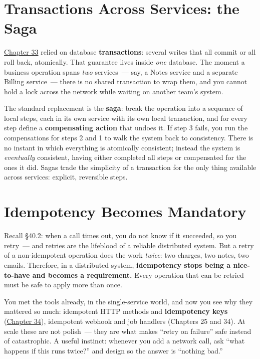 \setcounter{section}{4}
\section{Transactions Across Services: the Saga}\label{40-distributed-systems:405-transactions-across-services-the-saga}

\hyperref[ch:33-logic-execution]{Chapter 33} relied on database \textbf{transactions}: several writes that all commit or all roll back, atomically. That guarantee lives inside \emph{one} database. The moment a business operation spans \emph{two} services~--- say, a Notes service and a separate Billing service~--- there is no shared transaction to wrap them, and you cannot hold a lock across the network while waiting on another team's system.

The standard replacement is the \textbf{saga}: break the operation into a sequence of local steps, each in its own service with its own local transaction, and for every step define a \textbf{compensating action} that undoes it. If step 3 fails, you run the compensations for steps 2 and 1 to walk the system back to consistency. There is no instant in which everything is atomically consistent; instead the system is \emph{eventually} consistent, having either completed all steps or compensated for the ones it did. Sagas trade the simplicity of a transaction for the only thing available across services: explicit, reversible steps.

\setcounter{section}{5}
\section{Idempotency Becomes Mandatory}\label{40-distributed-systems:406-idempotency-becomes-mandatory}

Recall §40.2: when a call times out, you do not know if it succeeded, so you retry~--- and retries are the lifeblood of a reliable distributed system. But a retry of a non-idempotent operation does the work \emph{twice}: two charges, two notes, two emails. Therefore, in a distributed system, \textbf{idempotency stops being a nice-to-have and becomes a requirement.} Every operation that can be retried must be safe to apply more than once.

You met the tools already, in the single-service world, and now you see why they mattered so much: idempotent HTTP methods and \textbf{idempotency keys} (\hyperref[ch:34-response-handling]{Chapter 34}), idempotent webhook and job handlers (Chapters 25 and 34). At scale these are not polish~--- they are what makes ``retry on failure'' safe instead of catastrophic. A useful instinct: whenever you add a network call, ask ``what happens if this runs twice?'' and design so the answer is ``nothing bad.''

